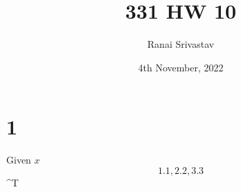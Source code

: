 \documentclass{article}
\title{331 HW 10}
\author{Ranai Srivastav}
\date{4th November, 2022}
\begin{document}
\maketitle

\section{1}

Given $x$ \[1.1, 2.2, 3.3\]^{T}
\end{document}

